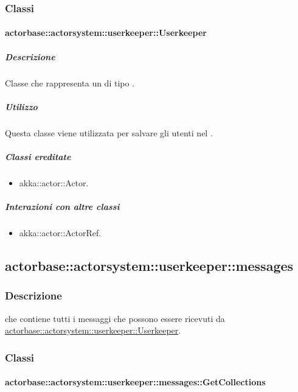 \documentclass{scalatekids-article}
\begin{document}
\subsubsection{Classi}

\paragraph{actorbase::actorsystem::userkeeper::Userkeeper}
\label{sec:actorbase::actorsystem::userkeeper::Userkeeper}

\subparagraph{Descrizione}

Classe che rappresenta un  di tipo .

\subparagraph{Utilizzo}

Questa classe viene utilizzata per salvare gli utenti nel .

\subparagraph{Classi ereditate}

\begin{itemize}

\item akka::actor::Actor.

\end{itemize}

\subparagraph{Interazioni con altre classi}

\begin{itemize}
\item akka::actor::ActorRef.
\end{itemize}

\subsection{actorbase::actorsystem::userkeeper::messages}
\label{sec:actorbase::actorsystem::userkeeper::messages}

\subsubsection{Descrizione}

 che contiene tutti i messaggi che possono essere ricevuti da
\hyperref[sec:actorbase::actorsystem::userkeeper::Userkeeper]{actorbase::actorsystem::userkeeper::Userkeeper}.

\subsubsection{Classi}

\paragraph{actorbase::actorsystem::userkeeper::messages::GetCollections}
\label{sec:actorbase::actorsystem::userkeeper::messages::GetCollections}
\end{document}
